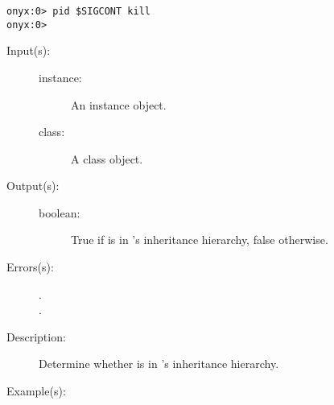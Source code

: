 \begin{description}
\begin{description}
\begin{verbatim}
onyx:0> pid $SIGCONT kill
onyx:0>
		\end{verbatim}
	\end{description}
\label{systemdict:kind}
\item[{\onyxop{instance class}{kind}{boolean}}: ]
	\begin{description}\item[]
	\item[Input(s): ]
		\begin{description}\item[]
		\item[instance: ]
			An instance object.
		\item[class: ]
			A class object.
		\end{description}
	\item[Output(s): ]
		\begin{description}\item[]
		\item[boolean: ]
			True if  is in 's
			inheritance hierarchy, false otherwise.
		\end{description}
	\item[Errors(s): ]
		\begin{description}\item[]
		\item[.]
		\item[.]
		\end{description}
	\item[Description: ]
		Determine whether  is in 's
		inheritance hierarchy.
	\item[Example(s): ]\begin{verbatim}


\end{verbatim}
\end{description}
\end{description}
